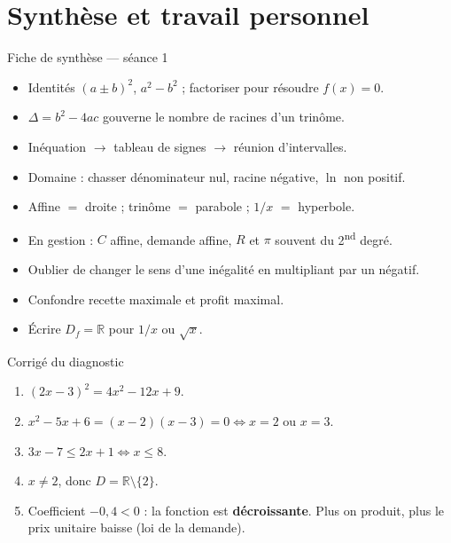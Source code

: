 \documentclass[10pt,aspectratio=169]{beamer}
\numberwithin{dummy}{section}
\newcommand{\R}{\mathbb{R}}
\newcommand{\CT}{C}
\newcommand{\Rec}{R}
\newcommand{\Prof}{\pi}
\begin{document}
\section{Synthèse et travail personnel}

\begin{frame}{Fiche de synthèse --- séance 1}
\begin{boxsynthese}
\begin{itemize}
    \item Identités $(a\pm b)^2$, $a^2-b^2$ ; factoriser pour résoudre $f(x)=0$.
    \item $\Delta=b^2-4ac$ gouverne le nombre de racines d'un trinôme.
    \item Inéquation $\to$ tableau de signes $\to$ réunion d'intervalles.
    \item Domaine : chasser dénominateur nul, racine négative, $\ln$ non positif.
    \item Affine $=$ droite ; trinôme $=$ parabole ; $1/x$ $=$ hyperbole.
    \item En gestion : $\CT$ affine, demande affine, $\Rec$ et $\Prof$ souvent du 2\textsuperscript{nd} degré.
\end{itemize}
\end{boxsynthese}

\vspace{0.3em}
\begin{boxattention}[Pièges]
\begin{itemize}
    \item Oublier de changer le sens d'une inégalité en multipliant par un négatif.
    \item Confondre recette maximale et profit maximal.
    \item Écrire $D_f=\R$ pour $1/x$ ou $\sqrt{x}$.
\end{itemize}
\end{boxattention}
\end{frame}

\begin{frame}{Corrigé du diagnostic}
\begin{enumerate}\setlength{\itemsep}{0.45em}
    \item $(2x-3)^2=4x^2-12x+9$.
    \item $x^2-5x+6=(x-2)(x-3)=0 \iff x=2$ ou $x=3$.
    \item $3x-7\leqslant 2x+1 \iff x\leqslant 8$.
    \item $x\neq 2$, donc $D=\R\setminus\{2\}$.
    \item Coefficient $-0{,}4<0$ : la fonction est \textbf{décroissante}.
    Plus on produit, plus le prix unitaire baisse (loi de la demande).
\end{enumerate}
\end{frame}
\end{document}

